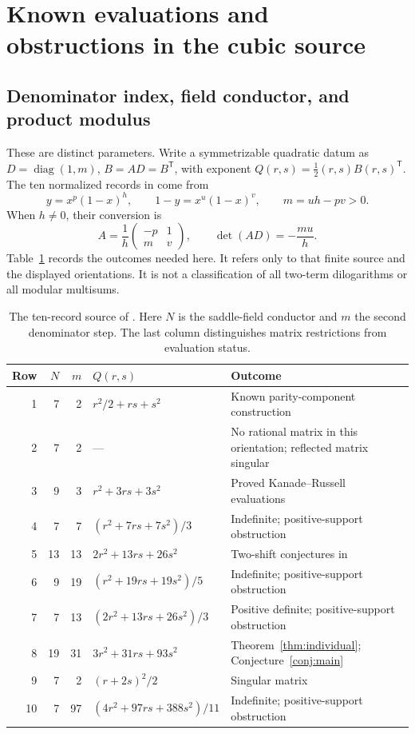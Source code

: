 \documentclass[11pt,reqno]{amsart}
\newcommand{\diag}{\operatorname{diag}}
\theoremstyle{remark}
\numberwithin{equation}{section}
\begin{document}
\section{Known evaluations and obstructions in the cubic source}
\label{sec:arithmetic}
\subsection{Denominator index, field conductor, and product modulus}
These are distinct parameters. Write a symmetrizable quadratic datum as
$D=\diag(1,m)$, $B=AD=B^{\mathsf T}$, with exponent
$Q(r,s)=\tfrac12(r,s)B(r,s)^{\mathsf T}$.
The ten normalized records in \cite[Table~3]{Brown} come from
\[
 y=x^p(1-x)^h,\qquad 1-y=x^u(1-x)^v,\qquad m=uh-pv>0.
\]
When $h\ne0$, their conversion is
\begin{equation}\label{eq:conversion}
 A=\frac1h\begin{pmatrix}-p&1\\m&v\end{pmatrix},\qquad
 \det(AD)=-\frac{mu}{h}.
\end{equation}
Table~\ref{tab:source} records the outcomes needed here. It refers only
to that finite source and the displayed orientations. It is not a
classification of all two-term dilogarithms or all modular multisums.

\begin{table}[htbp]
\caption{The ten-record source of \cite{Brown}. Here $N$ is the saddle-field
conductor and $m$ the second denominator step. The last column distinguishes
matrix restrictions from evaluation status.}\label{tab:source}
\centering\small
\renewcommand{\arraystretch}{1.22}
\begin{tabularx}{\textwidth}{@{}rrrlX@{}}\toprule
Row&$N$&$m$&$Q(r,s)$&Outcome\\\midrule
1&7&2&$r^2/2+rs+s^2$&Known parity-component construction \cite{Mizuno}\\
2&7&2&---&No rational matrix in this orientation; reflected matrix singular\\
3&9&3&$r^2+3rs+3s^2$&Proved Kanade--Russell evaluations\\
4&7&7&$(r^2+7rs+7s^2)/3$&Indefinite; positive-support obstruction\\
5&13&13&$2r^2+13rs+26s^2$&Two-shift conjectures in \cite{Brown}\\
6&9&19&$(r^2+19rs+19s^2)/5$&Indefinite; positive-support obstruction\\
7&7&13&$(2r^2+13rs+26s^2)/3$&Positive definite; positive-support obstruction\\
8&19&31&$3r^2+31rs+93s^2$&Theorem~\ref{thm:individual}; Conjecture~\ref{conj:main}\\
9&7&2&$(r+2s)^2/2$&Singular matrix\\
10&7&97&$(4r^2+97rs+388s^2)/11$&Indefinite; positive-support obstruction\\\bottomrule
\end{tabularx}
\end{table}
\end{document}
